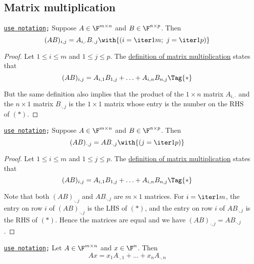 \subsection{Matrix multiplication}\label{f41e26f}

\label{bfd6f3c}

\texttt{\href{d76dfe6}{use notation};} Suppose $A\in\F^{m\times n}$ and
$B\in\F^{n\times p}$. Then
$$
  (AB)_{i,j}=A_{i,\cdot}B_{\cdot,j}\with{(i=\iter1m;\ j=\iter1p)}
$$

\begin{proof}
  Let $1\leq i\leq m$ and $1\leq j\leq p$. The \href{d786633}{definition of
  matrix multiplication} states that
  \begin{equation*}
    (AB)_{i,j}=A_{i,1}B_{1,j}+\ldots+A_{i,n}B_{n,j}\Tag{*}
  \end{equation*}

  But the same definition also implies that the product of the $1\times n$
  matrix $A_{i,\cdot}$ and the $n\times 1$ matrix $B_{\cdot,j}$ is the $1\times
  1$ matrix whose entry is the number on the RHS of $(*)$.
\end{proof}

\label{a27f96a}

\texttt{\href{d76dfe6}{use notation};} Suppose $A\in\F^{m\times n}$ and
$B\in\F^{n\times p}$. Then
$$
  (AB)_{\cdot,j}=AB_{\cdot,j}\with{(j=\iter1p)}
$$

\begin{proof}
  Let $1\leq i\leq m$ and $1\leq j\leq p$. The \href{d786633}{definition of
  matrix multiplication} states that
  \begin{equation*}
    (AB)_{i,j}=A_{i,1}B_{1,j}+\ldots+A_{i,n}B_{n,j}\Tag{*}
  \end{equation*}

  Note that both $(AB)_{\cdot,j}$ and $AB_{\cdot,j}$ are $m\times 1$ matrices.
  For $i=\iter1m$, the entry on row $i$ of $(AB)_{\cdot,j}$ is the LHS of
  $(*)$, and the entry on row $i$ of $AB_{\cdot,j}$ is the RHS of $(*)$. Hence
  the matrices are equal and we have $(AB)_{\cdot,j}=AB_{\cdot,j}$.
\end{proof}

\label{be0cc53}

\texttt{\href{d76dfe6}{use notation};} Let $A\in\F^{m\times n}$ and $x\in\F^n$.
Then
$$
  Ax=x_1A_{\cdot,1}+\ldots+x_nA_{\cdot,n}
$$

